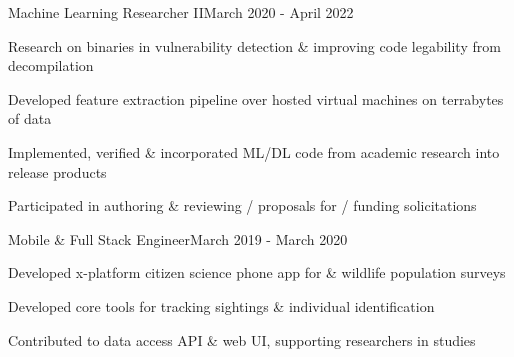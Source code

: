 \documentclass{article}
\newenvironment{**mylist}[2]{

\subsubsection*{#1\hfill#2}
  \small
  \begin{list}{}{}
    \setlength{\topsep}{0pt}
   \setlength{\itemsep}{1pt}
   \setlength{\parskip}{0pt}
   \setlength{\parsep}{0pt}}{\end{list}\normalsize}
\newcommand{\LU}[1]{\hspace{-1em}{\bf Technologies : #1}}
\begin{document}
\begin{**mylist}{\href{https://www.grammatech.com}{} \tabb Machine Learning Researcher II}{March 2020 - April 2022}
\item Research on binaries in vulnerability detection \& improving code legability from decompilation
\item Developed feature extraction pipeline over hosted virtual machines on terrabytes of data
\item Implemented, verified \& incorporated ML/DL code from academic research into release products
\item Participated in authoring \& reviewing / proposals for / funding solicitations
\end{**mylist}

\begin{**mylist}{\href{www.happywhale.com}{} \tabb Mobile \& Full Stack Engineer}{March 2019 - March 2020}
\item Developed %
  x-platform citizen science phone app
  for
   \& wildlife population  surveys
\item Developed core tools for tracking  sightings \& individual  identification
\item Contributed to data access API \& web UI, supporting researchers in  studies
\end{**mylist}
\end{document}
